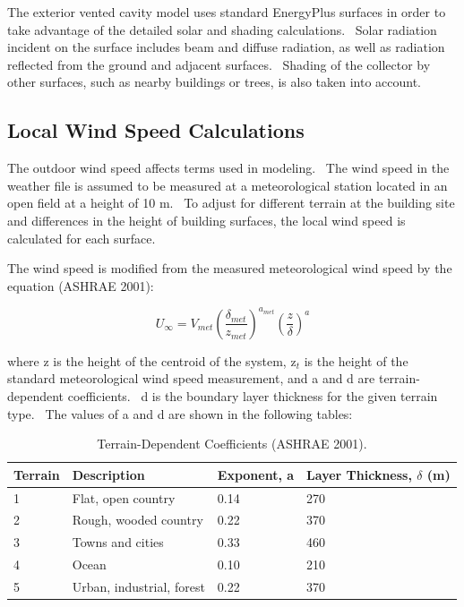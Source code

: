 The exterior vented cavity model uses standard EnergyPlus surfaces in order to take advantage of the detailed solar and shading calculations.~ Solar radiation incident on the surface includes beam and diffuse radiation, as well as radiation reflected from the ground and adjacent surfaces.~ Shading of the collector by other surfaces, such as nearby buildings or trees, is also taken into account.

\subsection{Local Wind Speed Calculations}\label{local-wind-speed-calculations}

The outdoor wind speed affects terms used in modeling.~ The wind speed in the weather file is assumed to be measured at a meteorological station located in an open field at a height of 10 m.~ To adjust for different terrain at the building site and differences in the height of building surfaces, the local wind speed is calculated for each surface.

The wind speed is modified from the measured meteorological wind speed by the equation (ASHRAE 2001):

\begin{equation}
{U_\infty } = {V_{met}}{\left( {\frac{{{\delta_{met}}}}{{{z_{met}}}}} \right)^{{a_{met}}}}{\left( {\frac{z}{\delta }} \right)^a}
\end{equation}

where z is the height of the centroid of the system, z\(_{t}\) is the height of the standard meteorological wind speed measurement, and a and d are terrain-dependent coefficients.~ d is the boundary layer thickness for the given terrain type.~ The values of a and d are shown in the following tables:

\begin{longtable}[c]{@{}llll@{}}
\caption{Terrain-Dependent Coefficients (ASHRAE 2001). \protect \label{table:terrain-dependent-coefficients-ashrae-2001.}}\\
\toprule 
Terrain & Description & Exponent, a & Layer Thickness, $\delta$ (m) \tabularnewline \midrule
\endhead
1 & Flat, open country & 0.14 & 270 \tabularnewline
2 & Rough, wooded country & 0.22 & 370 \tabularnewline
3 & Towns and cities & 0.33 & 460 \tabularnewline
4 & Ocean & 0.10 & 210 \tabularnewline
5 & Urban, industrial, forest & 0.22 & 370 \tabularnewline
\bottomrule
\end{longtable}

